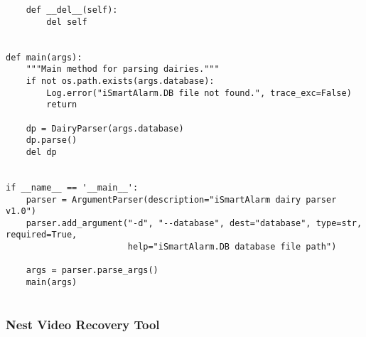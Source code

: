 \documentclass{easychair}
\begin{document}
\begin{lstlisting}
    def __del__(self):
        del self


def main(args):
    """Main method for parsing dairies."""
    if not os.path.exists(args.database):
        Log.error("iSmartAlarm.DB file not found.", trace_exc=False)
        return

    dp = DairyParser(args.database)
    dp.parse()
    del dp


if __name__ == '__main__':
    parser = ArgumentParser(description="iSmartAlarm dairy parser v1.0")
    parser.add_argument("-d", "--database", dest="database", type=str, required=True,
                        help="iSmartAlarm.DB database file path")

    args = parser.parse_args()
    main(args)


\end{lstlisting}

\subsubsection{Nest Video Recovery Tool}
\end{document}
